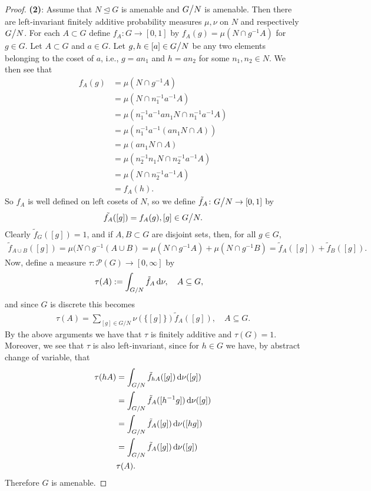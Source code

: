 \begin{proposition}
\begin{proof}
\textbf{(2)}: Assume that $ N \trianglelefteq G$ is amenable and $G \bign/ N$ is amenable. Then there are left-invariant finitely additive probability measures $\mu,\nu$ on $N$ and respectively $G \bign/ N$. For each $A \subset G$ define $f_{A} \colon G \to [0,1] $ by $f_{A}(g)=\mu(N \cap g^{-1}A)$ for $g \in G$. Let $A \subset G$ and $a \in G$. Let $g,h \in [a] \in G \bign/ N$ be any two elements belonging to the coset of $a$, i.e., $g=an_{1}$ and $h=an_{2}$ for some $n_{1},n_{2} \in N$. We then see that
\begin{align*}
f_{A}(g)&=\mu(N \cap g^{-1}A)\\
&=\mu(N\cap n_{1}^{-1}a^{-1} A)\\
&=\mu(n_{1}^{-1} a^{-1} a n_{1} N \cap n_{1}^{-1} a^{-1} A)\\
&=\mu(n_{1}^{-1} a^{-1} (a n_{1} N \cap A))\\
&=\mu(a n_1 N \cap A)\\
&=\mu(n_{2}^{-1} n_{1} N \cap n_{2}^{-1} a^{-1} A)\\
&=\mu(N \cap n_{2}^{-1}a^{-1}A)\\
&=f_{A}(h).
\end{align*}
So $f_{A}$ is well defined on left cosets of $N$, so we define $\tilde{f}_{A} \colon G \bign/ N \to [0,1]$ by
\begin{align*}
\tilde{f_A}([g])=f_A(g), [g] \in G \bign/ N.
\end{align*} 
Clearly $\tilde{f}_{G}([g])=1$, and if $A,B \subset G$ are disjoint sets, then, for all $g \in G$,
\begin{align*}
\tilde{f}_{A \cup B}([g])=\mu(N \cap g^{-1}(A \cup B)=\mu(N \cap g^{-1}A) + \mu(N \cap g^{-1}B)=\tilde{f}_{A}([g])+\tilde{f}_{B}([g]).
\end{align*}
Now, define a measure $\tau \colon \mathcal{P}(G) \to [0,\infty]$ by
\begin{align*}
\tau(A)&:=\int_{G / N} \tilde{f}_{A}  \mathop{}\!\mathrm{d} \nu, \quad A \subseteq G,
\end{align*}
and since $G$ is discrete this becomes
\begin{align*}
\tau(A)=\sum_{[g] \in G/ N} \nu(\{[g]\}) \tilde{f}_{A}([g]), \quad A \subseteq G.
\end{align*}
By the above arguments we have that $\tau$ is finitely additive and $\tau(G)=1$. Moreover, we see that $\tau$ is also left-invariant, since for $h \in G$ we have, by abstract change of variable, that
\begin{align*}
\tau(hA)&=\int_{G / N} \tilde{f}_{hA}([g]) \mathop{}\!\mathrm{d} \nu([g])\\
&=\int_{G / N} \tilde{f}_{A}([h^{-1}g]) \mathop{}\!\mathrm{d} \nu([g])\\
&=\int_{G / N} \tilde{f}_{A}([g]) \mathop{}\!\mathrm{d} \nu([h g])\\
&=\int_{G / N} \tilde{f}_{A}([g]) \mathop{}\!\mathrm{d} \nu([g])\\
&\tau(A).
\end{align*} 
Therefore $G$ is amenable.


\end{proof}
\end{proposition}
